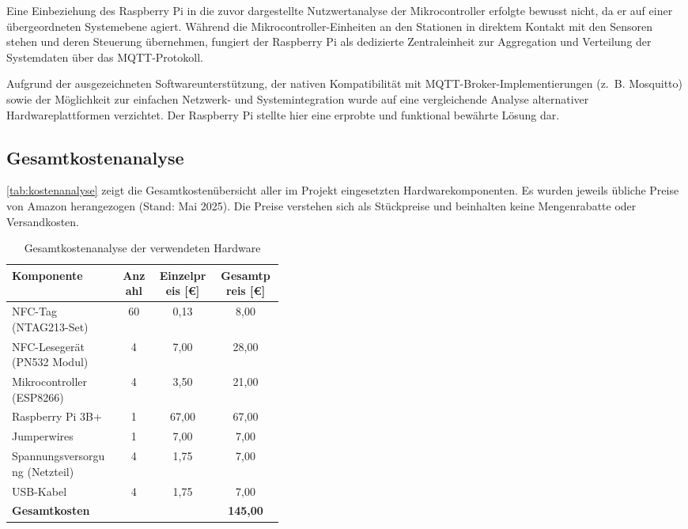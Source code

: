 Eine Einbeziehung des Raspberry Pi in die zuvor dargestellte Nutzwertanalyse der Mikrocontroller erfolgte bewusst nicht, da er auf einer übergeordneten Systemebene agiert. Während die Mikrocontroller-Einheiten an den Stationen in direktem Kontakt mit den Sensoren stehen und deren Steuerung übernehmen, fungiert der Raspberry Pi als dedizierte Zentraleinheit zur Aggregation und Verteilung der Systemdaten über das MQTT-Protokoll.

Aufgrund der ausgezeichneten Softwareunterstützung, der nativen Kompatibilität mit MQTT-Broker-Implementierungen (z.~B. Mosquitto) sowie der Möglichkeit zur einfachen Netzwerk- und Systemintegration wurde auf eine vergleichende Analyse alternativer Hardwareplattformen verzichtet. Der Raspberry Pi stellte hier eine erprobte und funktional bewährte Lösung dar.

\subsection{Gesamtkostenanalyse}
\label{sec:gesamtkostenanalyse}

\autoref{tab:kostenanalyse} zeigt die Gesamtkostenübersicht aller im Projekt eingesetzten Hardwarekomponenten. Es wurden jeweils übliche Preise von Amazon herangezogen (Stand: Mai 2025). Die Preise verstehen sich als Stückpreise und beinhalten keine Mengenrabatte oder Versandkosten.

\begin{table}[H]
	\centering
	\caption{Gesamtkostenanalyse der verwendeten Hardware}
	\label{tab:kostenanalyse}
	\begin{tabular}{|p{0.4\linewidth}|c|c|c|}
		\hline
		\textbf{Komponente} & \textbf{Anzahl} & \textbf{Einzelpreis [€]} & \textbf{Gesamtpreis [€]} \\
		\hline
		NFC-Tag (NTAG213-Set) & 60 & 0{,}13 & 8{,}00 \\
		NFC-Lesegerät (PN532 Modul) & 4 & 7{,}00 & 28{,}00 \\
		Mikrocontroller (ESP8266) & 4 & 3{,}50 & 21{,}00 \\
		Raspberry Pi 3B+ & 1 & 67{,}00 & 67{,}00 \\
		Jumperwires & 1 & 7{,}00 & 7{,}00 \\
		Spannungsversorgung (Netzteil) & 4 & 1{,}75 & 7{,}00 \\
		USB-Kabel & 4 & 1{,}75 & 7{,}00 \\
		\hline
		\textbf{Gesamtkosten} & & & \textbf{145{,}00} \\
		\hline
	\end{tabular}
\end{table}

